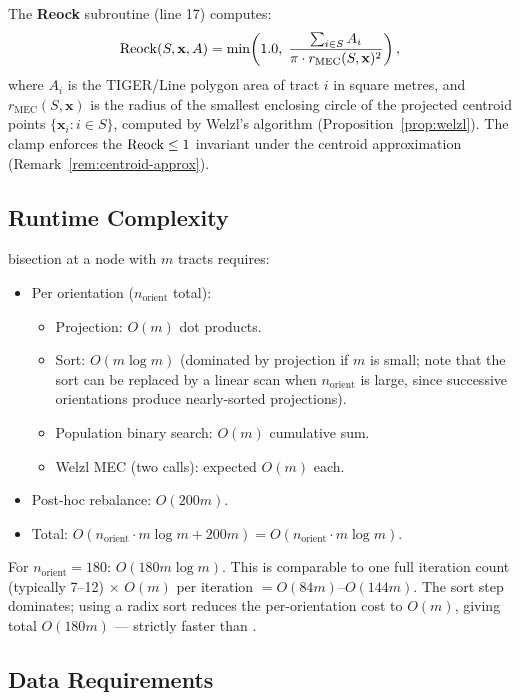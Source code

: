The \textbf{Reock} subroutine (line 17) computes:
\[
  \mathrm{Reock}{}(S, \mathbf{x}, A) =
  \min\!\left(1.0,\;
    \frac{\sum_{i \in S} A_i}{\pi \cdot r_{\mathrm{MEC}}(S, \mathbf{x})^2}
  \right),
\]
where $A_i$ is the TIGER/Line polygon area of tract $i$ in square metres,
and $r_{\mathrm{MEC}}(S, \mathbf{x})$ is the radius of the smallest enclosing
circle of the projected centroid points $\{\mathbf{x}_i : i \in S\}$,
computed by Welzl's algorithm (Proposition~\ref{prop:welzl}).
The clamp enforces the $\mathrm{Reock}{} \le 1$ invariant under the centroid
approximation (Remark~\ref{rem:centroid-approx}).

\subsection{Runtime Complexity}

\begin{proposition}
\label{prop:mka-runtime}
\mka{} bisection at a node with $m$ tracts requires:
\begin{itemize}
\item Per orientation ($n_{\mathrm{orient}}$ total):
  \begin{itemize}
  \item Projection: $O(m)$ dot products.
  \item Sort: $O(m \log m)$ (dominated by projection if $m$ is small;
    note that the sort can be replaced by a linear scan when $n_{\mathrm{orient}}$
    is large, since successive orientations produce nearly-sorted projections).
  \item Population binary search: $O(m)$ cumulative sum.
  \item Welzl MEC (two calls): expected $O(m)$ each.
  \end{itemize}
\item Post-hoc rebalance: $O(200m)$.
\item Total: $O(n_{\mathrm{orient}} \cdot m \log m + 200m)
            = O(n_{\mathrm{orient}} \cdot m \log m)$.
\end{itemize}
For $n_{\mathrm{orient}} = 180$: $O(180 m \log m)$.
This is comparable to one full \cvdgeo{} iteration count (typically 7--12)
$\times$ $O(m)$ per iteration $= O(84m)$--$O(144m)$.
The sort step dominates; using a radix sort reduces the per-orientation
cost to $O(m)$, giving total $O(180m)$ --- strictly faster than \cvdgeo{}.
\end{proposition}

\subsection{Data Requirements}
\label{subsec:data}

